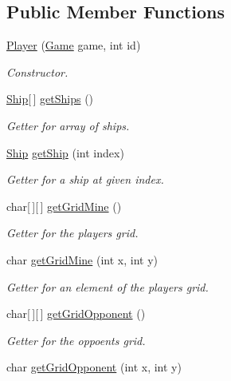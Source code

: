 \subsection*{Public Member Functions}
\begin{DoxyCompactItemize}
\item 
\hyperlink{classPlayer_a0444e17b6e068f2cbee6937244c8f921}{Player} (\hyperlink{classGame}{Game} game, int id)
\begin{DoxyCompactList}\small\item\em Constructor. \end{DoxyCompactList}\item 
\hyperlink{classShip}{Ship}\mbox{[}$\,$\mbox{]} \hyperlink{classPlayer_a992bcaa016d561372f176b0021b624d2}{get\+Ships} ()
\begin{DoxyCompactList}\small\item\em Getter for array of ships. \end{DoxyCompactList}\item 
\hyperlink{classShip}{Ship} \hyperlink{classPlayer_af2d7d0a6c12ccb105fedf289516463ca}{get\+Ship} (int index)
\begin{DoxyCompactList}\small\item\em Getter for a ship at given index. \end{DoxyCompactList}\item 
char\mbox{[}$\,$\mbox{]}\mbox{[}$\,$\mbox{]} \hyperlink{classPlayer_ae9eb4d4e55b285791cdfa946f33042ae}{get\+Grid\+Mine} ()
\begin{DoxyCompactList}\small\item\em Getter for the player\textquotesingle{}s grid. \end{DoxyCompactList}\item 
char \hyperlink{classPlayer_aee4d0aabd398122c3406d9a193d2fc33}{get\+Grid\+Mine} (int x, int y)
\begin{DoxyCompactList}\small\item\em Getter for an element of the player\textquotesingle{}s grid. \end{DoxyCompactList}\item 
char\mbox{[}$\,$\mbox{]}\mbox{[}$\,$\mbox{]} \hyperlink{classPlayer_ae8c3f7b3895e4d8f5e96f5f072bf7211}{get\+Grid\+Opponent} ()
\begin{DoxyCompactList}\small\item\em Getter for the oppoent\textquotesingle{}s grid. \end{DoxyCompactList}\item 
char \hyperlink{classPlayer_ab82aed9ca2e326d51614a6287dd355d9}{get\+Grid\+Opponent} (int x, int y)

\end{DoxyCompactItemize}
